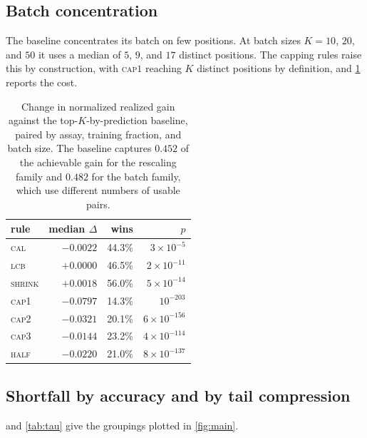 \documentclass{article}
\theoremstyle{plain}
\theoremstyle{definition}
\begin{document}
\subsection{Batch concentration}
\label{app:concentration}

The baseline concentrates its batch on few positions. At batch sizes $K = 10$, $20$,
and $50$ it uses a median of $5$, $9$, and $17$ distinct positions. The capping rules
raise this by construction, with \textsc{cap}$1$ reaching $K$ distinct positions by
definition, and \cref{tab:fix} reports the cost.

\begin{table}[ht]
\caption{Change in normalized realized gain against the top-$K$-by-prediction baseline,
paired by assay, training fraction, and batch size. The baseline captures $0.452$ of
the achievable gain for the rescaling family and $0.482$ for the batch family, which
use different numbers of usable pairs.}
\label{tab:fix}
\vskip 0.1in
\begin{center}
\begin{small}
\begin{tabular}{lrrr}
\toprule
rule & median $\Delta$ & wins & $p$ \\
\midrule
\textsc{cal}    & $-0.0022$ & 44.3\% & $3{\times}10^{-5}$ \\
\textsc{lcb}    & $+0.0000$ & 46.5\% & $2{\times}10^{-11}$ \\
\textsc{shrink} & $+0.0018$ & 56.0\% & $5{\times}10^{-14}$ \\
\midrule
\textsc{cap}1   & $-0.0797$ & 14.3\% & $10^{-203}$ \\
\textsc{cap}2   & $-0.0321$ & 20.1\% & $6{\times}10^{-156}$ \\
\textsc{cap}3   & $-0.0144$ & 23.2\% & $4{\times}10^{-114}$ \\
\textsc{half}   & $-0.0220$ & 21.0\% & $8{\times}10^{-137}$ \\
\bottomrule
\end{tabular}
\end{small}
\end{center}
\vskip -0.1in
\end{table}

\subsection{Shortfall by accuracy and by tail compression}
\label{app:strata}

 and \cref{tab:tau} give the groupings plotted in \cref{fig:main}.
\end{document}
